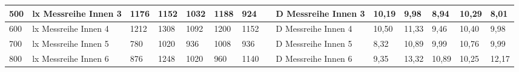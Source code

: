 \begin{table}[H]
{\begin{tabular}{|l|l|l|l|l|l|l|l|l|l|l|l|l|l|}
    \rowcolor[HTML]{C6E0B4} 
    500                                             & lx   Messreihe Innen 3                                    & 1176                              & 1152                              & 1032                              & 1188                              & 924                               & \cellcolor[HTML]{A9D08E}{\color[HTML]{000000} 11540}          & D   Messreihe Innen 3                                      & 10,19                                     & 9,98                                       & 8,94                                       & 10,29                                      & 8,01                                       \\ \hline
    \rowcolor[HTML]{E2EFDA} 
    600                                             & lx   Messreihe Innen 4                                    & 1212                              & 1308                              & 1092                              & 1200                              & 1152                              & \cellcolor[HTML]{A9D08E}{\color[HTML]{000000} 11540}          & D   Messreihe Innen 4                                      & 10,50                                     & 11,33                                      & 9,46                                       & 10,40                                      & 9,98                                       \\ \hline
    \rowcolor[HTML]{C6E0B4} 
    700                                             & lx  Messreihe Innen 5                                     & 780                               & 1020                              & 936                               & 1008                              & 936                               & \cellcolor[HTML]{A9D08E}{\color[HTML]{000000} 9370}           & D  Messreihe Innen 5                                       & 8,32                                      & 10,89                                      & 9,99                                       & 10,76                                      & 9,99                                       \\ \hline
    \rowcolor[HTML]{E2EFDA} 
    800                                             & lx   Messreihe Innen 6                                    & 876                               & 1248                              & 1020                              & 960                               & 1140                              & \cellcolor[HTML]{A9D08E}{\color[HTML]{000000} 9370}           & D   Messreihe Innen 6                                      & 9,35                                      & 13,32                                      & 10,89                                      & 10,25                                      & 12,17                                      \\ \hline
    \end{tabular}%
    }
    \end{table}
